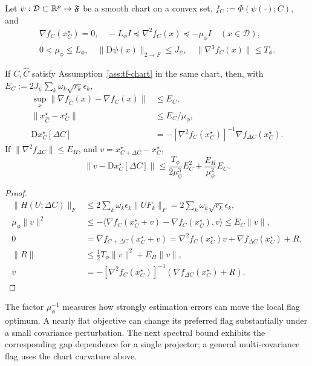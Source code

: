 \begin{assumption}\label{ass:tf-chart}
Let $\psi:\mathcal D\subset\mathbb R^p\to\mathfrak F$ be a smooth chart on a convex
set, $f_C:=\Phi(\psi(\cdot);C)$, and
\begin{gather}
 \nabla f_C(x_C^\star)=0,\quad
 -L_\phi I\preceq\nabla^2 f_C(x)\preceq-\mu_\phi I\quad(x\in\mathcal D),\\
 0<\mu_\phi\le L_\phi,\quad
 \|\mathrm D\psi(x)\|_{2\to F}\le J_\psi,\quad
 \|\nabla^3 f_C(x)\|\le T_\phi.
\end{gather}
\end{assumption}
\begin{lemma}\label{lem:tf-oracle}
If $C,\widehat C$ satisfy Assumption~\ref{ass:tf-chart} in the same chart,
then, with $E_C:=2J_\psi\sum_k\omega_k\sqrt{r_k}\epsilon_k$,
\begin{align}
 \sup_x\|\nabla f_{\widehat C}(x)-\nabla f_C(x)\|&\le E_C,\\
 \|x_{\widehat C}^\star-x_C^\star\|&\le E_C/\mu_\phi,\\
 \mathrm D x_C^\star[\Delta C]
 &=-[\nabla^2 f_C(x_C^\star)]^{-1}
                 \nabla f_{\Delta C}(x_C^\star).
\end{align}
If $\|\nabla^2f_{\Delta C}\|\le E_H$, and $v=x_{C+\Delta C}^\star-x_C^\star$,
\begin{equation}
 \|v-\mathrm D x_C^\star[\Delta C]\|
 \le\frac{T_\phi}{2\mu_\phi^3}E_C^2+
                         \frac{E_H}{\mu_\phi^2}E_C.
\end{equation}
\end{lemma}
\begin{proof}
\begin{align}
 \|H(U;\Delta C)\|_F&\le2\sum_k\omega_k\epsilon_k\|UF_k\|_F
 =2\sum_k\omega_k\sqrt{r_k}\epsilon_k,\\
 \mu_\phi\|v\|^2
 &\le-\langle\nabla f_C(x_C^\star+v)-\nabla f_C(x_C^\star),v\rangle
 \le E_C\|v\|,\\
 0&=\nabla f_{C+\Delta C}(x_C^\star+v)
 =\nabla^2 f_C(x_C^\star)v+\nabla f_{\Delta C}(x_C^\star)+R,\\
 \|R\|&\le\tfrac12T_\phi\|v\|^2+E_H\|v\|,\\
 v&=-[\nabla^2 f_C(x_C^\star)]^{-1}
                  (\nabla f_{\Delta C}(x_C^\star)+R).
\end{align}
\end{proof}
The factor $\mu_\phi^{-1}$ measures how strongly estimation errors can move the
local flag optimum. A nearly flat objective can change its preferred flag
substantially under a small covariance perturbation. The next spectral bound
exhibits the corresponding gap dependence for a single projector; a general
multi-covariance flag uses the chart curvature above.

